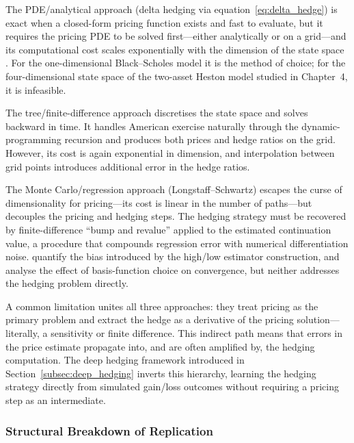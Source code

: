 The PDE/analytical approach (delta hedging via
equation~\eqref{eq:delta_hedge}) is exact when a closed-form pricing
function exists and fast to evaluate, but it requires the pricing PDE to
be solved first---either analytically or on a grid---and its
computational cost scales exponentially with the dimension of the state
space \citep{Glasserman2003}.  For the one-dimensional Black--Scholes
model it is the method of choice; for the four-dimensional state space of
the two-asset Heston model studied in Chapter~4, it is infeasible.

The tree/finite-difference approach
\citep{CoxRossRubinstein1979,Brennan1977} discretises the state space
and solves backward in time.  It handles American exercise naturally
through the dynamic-programming recursion and produces both prices and
hedge ratios on the grid.  However, its cost is again exponential in
dimension, and interpolation between grid points introduces additional
error in the hedge ratios.

The Monte Carlo/regression approach (Longstaff--Schwartz) escapes
the curse of dimensionality for pricing---its cost is linear in the
number of paths---but decouples the pricing and hedging steps.  The
hedging strategy must be recovered by finite-difference ``bump and
revalue'' applied to the estimated continuation value, a procedure that
compounds regression error with numerical differentiation noise.
\citet{BroadieGlasserman2004} quantify the bias introduced by the
high/low estimator construction, and \citet{GlassermanYu2004} analyse the
effect of basis-function choice on convergence, but neither addresses the
hedging problem directly.

A common limitation unites all three approaches: they treat pricing as
the primary problem and extract the hedge as a derivative of the
pricing solution---literally, a sensitivity or finite difference.  This
indirect path means that errors in the price estimate propagate into, and
are often amplified by, the hedging computation.  The deep hedging
framework introduced in Section~\ref{subsec:deep_hedging} inverts this
hierarchy, learning the hedging strategy directly from simulated
gain/loss outcomes without requiring a pricing step as an intermediate.


\subsubsection{Structural Breakdown of Replication}
\label{sssec:breakdown}

